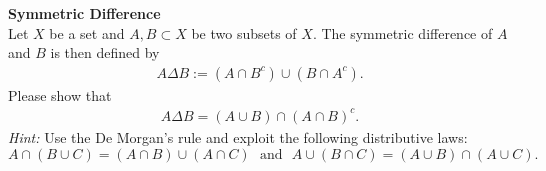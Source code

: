 \textbf{Symmetric Difference}\\
Let $X$ be a set and $A,B \subset X$ be two subsets of $X$. The symmetric difference of $A$ and $B$ is then defined by
	\begin{align*}
	A \Delta B := (A \cap {B}^c) \cup (B \cap {A}^c).
	\end{align*}
	Please show that 
	\begin{align*}
	A \Delta B = (A \cup B) \cap {(A \cap B)^c}.
	\end{align*}
\textit{Hint: }Use the De Morgan's rule and exploit the following distributive laws:
$$A \cap (B\cup C) = (A\cap B) \cup (A \cap C)~~~\text{and}~~~A \cup (B\cap C) = (A\cup B) \cap (A \cup C) .$$
